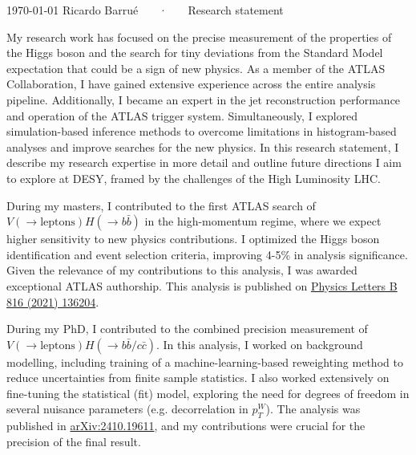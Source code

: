\documentclass[11pt, a4paper]{awesome-cv}
\begin{document}
\makecvheader[R]

\makecvfooter
  {\today}
  {Ricardo Barrué ~~~·~~~ Research statement}
  {}

\makelettertitle

\begin{cvletter}

  My research work has focused on the precise measurement of the properties of the Higgs boson and the search for tiny deviations from the Standard Model expectation that could be a sign of new physics. As a member of the ATLAS Collaboration, I have gained extensive experience across the entire analysis pipeline. Additionally, I became an expert in the jet reconstruction performance and operation of the ATLAS trigger system. Simultaneously, I explored simulation-based inference methods to overcome limitations in histogram-based analyses and improve searches for the new physics. In this research statement, I describe my research expertise in more detail and outline future directions I aim to explore at DESY, framed by the challenges of the High Luminosity LHC.

  
  During my masters, I contributed to the first ATLAS search of $V(\to \textrm{leptons})H(\to b\bar{b})$ in the high-momentum regime, where we expect higher sensitivity to new physics contributions. I optimized the Higgs boson identification and event selection criteria, improving 4-5\% in analysis significance. Given the relevance of my contributions to this analysis, I was awarded exceptional ATLAS authorship. This analysis is published on \href{https://doi.org/10.1016/j.physletb.2021.136204}{Physics Letters B 816 (2021) 136204}.
  
  During my PhD, I contributed to the combined precision measurement of $V(\to \textrm{leptons})H(\to b\bar{b}/c\bar{c})$. In this analysis, I worked on background modelling, including training of a machine-learning-based reweighting method to reduce uncertainties from finite sample statistics. I also worked extensively on fine-tuning the statistical (fit) model, exploring the need for degrees of freedom in several nuisance parameters (e.g. decorrelation in $p_T^W$). The analysis was published in \href{https://arxiv.org/abs/2410.19611}{arXiv:2410.19611}, and my contributions were crucial for the precision of the final result.
  

\end{cvletter}
\end{document}
